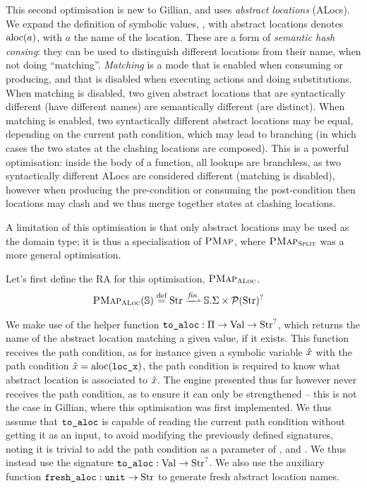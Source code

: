 This second optimisation is new to Gillian, and uses \emph{abstract locations} (ALocs). We expand the definition of symbolic values, , with abstract locations denotes $\text{aloc}(a)$, with $a$ the name of the location. These are a form of \emph{semantic hash consing}: they can be used to distinguish different locations from their name, when not doing ``matching''. \emph{Matching} is a mode that is enabled when consuming or producing, and that is disabled when executing actions and doing substitutions. When matching is disabled, two given abstract locations that are syntactically different (have different names) are semantically different (are distinct). When matching is enabled, two syntactically different abstract locations may be equal, depending on the current path condition, which may lead to branching (in which cases the two states at the clashing locations are composed). This is a powerful optimisation: inside the body of a function, all lookups are branchless, as two syntactically different ALocs are considered different (matching is disabled), however when producing the pre-condition or consuming the post-condition then locations may clash and we thus merge together states at clashing locations.

A limitation of this optimisation is that only abstract locations may be used as the domain type; it is thus a specialisation of $\textsc{PMap}$, where $\textsc{PMap}_{\textsc{Split}}$ was a more general optimisation.

Let's first define the RA for this optimisation, $\textsc{PMap}_{\textsc{ALoc}}$.
\begin{align*}
	\ALocPMap(\mmdl) &\defeq \Str \finmap \mmdl.\Sigma \times \pset(\Str)^?
\end{align*}

We make use of the helper function ${\texttt{to\_aloc}:\Pi\rightarrow \text{Val}\rightarrow \text{Str}^?}$, which returns the name of the abstract location matching a given value, if it exists.  This function receives the path condition, as for instance given a symbolic variable $\hat{x}$ with the path condition ${\hat{x} = \text{aloc}(\texttt{loc\_x})}$, the path condition is required to know what abstract location is associated to $\hat{x}$. The engine presented thus far however never receives the path condition, as to ensure it can only be strengthened -- this is not the case in Gillian, where this optimisation was first implemented. We thus assume that $\texttt{to\_aloc}$ is capable of reading the current path condition without getting it as an input, to avoid modifying the previously defined signatures, noting it is trivial to add the path condition as a parameter of \execac, \consume{} and \produce. We thus instead use the signature ${\texttt{to\_aloc}: \text{Val}\rightarrow\text{Str}^?}$. We also use the auxiliary function $\texttt{fresh\_aloc}: \texttt{unit} \rightarrow \text{Str}$ to generate fresh abstract location names.

